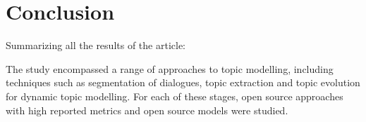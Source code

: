 \documentclass[PMI,VKR]{HSEUniversity}
\begin{document}
\chapter{Conclusion}

Summarizing all the results of the article:

The study encompassed a range of approaches to topic modelling, including techniques such as segmentation of dialogues, topic extraction and topic evolution for dynamic topic modelling.
For each of these stages, open source approaches with high reported metrics and open source models were studied.

\putbibliography
\end{document}

